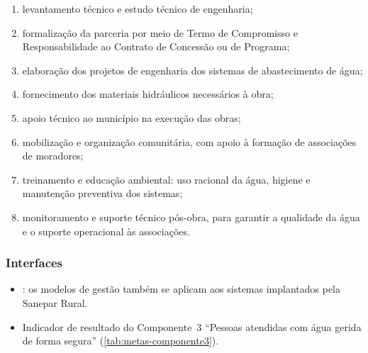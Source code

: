 \begin{enumerate}[label=\alph*)]
  \item levantamento técnico e estudo técnico de engenharia;
  \item formalização da parceria por meio de Termo de Compromisso e
        Responsabilidade ao Contrato de Concessão ou de Programa;
  \item elaboração dos projetos de engenharia dos sistemas de abastecimento
        de água;
  \item fornecimento dos materiais hidráulicos necessários à obra;
  \item apoio técnico ao município na execução das obras;
  \item mobilização e organização comunitária, com apoio à formação de
        associações de moradores;
  \item treinamento e educação ambiental: uso racional da água, higiene e
        manutenção preventiva dos sistemas;
  \item monitoramento e suporte técnico pós-obra, para garantir a qualidade
        da água e o suporte operacional às associações.
\end{enumerate}



\subsubsection{Interfaces}

\begin{itemize}
  \item {}: os modelos de gestão também se aplicam aos
        sistemas implantados pela Sanepar Rural.
  \item Indicador de resultado do Componente~3 ``Pessoas atendidas com água
        gerida de forma segura'' (\autoref{tab:metas-componente3}).
\end{itemize}
